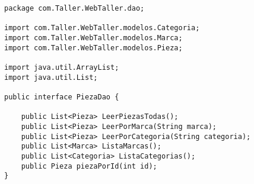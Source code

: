 

\begin{lstlisting}[caption=PiezaDao.java (LMSI)]
package com.Taller.WebTaller.dao;

import com.Taller.WebTaller.modelos.Categoria;
import com.Taller.WebTaller.modelos.Marca;
import com.Taller.WebTaller.modelos.Pieza;

import java.util.ArrayList;
import java.util.List;

public interface PiezaDao {

    public List<Pieza> LeerPiezasTodas();
    public List<Pieza> LeerPorMarca(String marca);
    public List<Pieza> LeerPorCategoria(String categoria);
    public List<Marca> ListaMarcas();
    public List<Categoria> ListaCategorias();
    public Pieza piezaPorId(int id);
}
\end{lstlisting}
\clearpage
